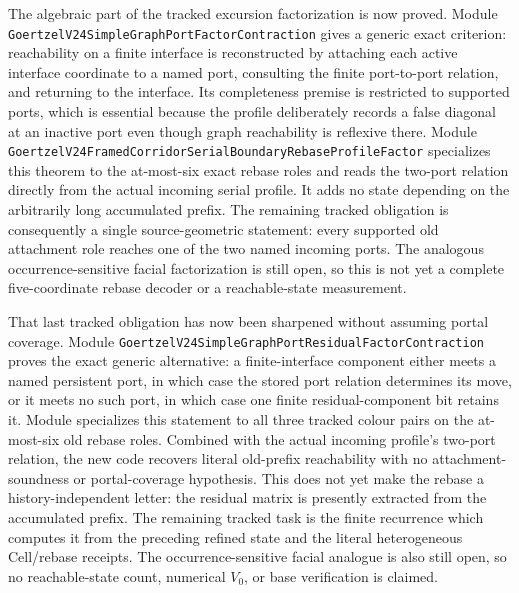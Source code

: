 \documentclass[11pt]{article}
\theoremstyle{definition}
\begin{document}
The algebraic part of the tracked excursion factorization is now proved.
Module
\texttt{GoertzelV24SimpleGraphPortFactorContraction} gives a generic exact
criterion: reachability on a finite interface is reconstructed by attaching
each active interface coordinate to a named port, consulting the finite
port-to-port relation, and returning to the interface.  Its completeness
premise is restricted to supported ports, which is essential because the
profile deliberately records a false diagonal at an inactive port even though
graph reachability is reflexive there.  Module
\texttt{GoertzelV24FramedCorridorSerialBoundaryRebaseProfileFactor}
specializes this theorem to the at-most-six exact rebase roles and reads the
two-port relation directly from the actual incoming serial profile.  It adds
no state depending on the arbitrarily long accumulated prefix.  The remaining
tracked obligation is consequently a single source-geometric statement:
every supported old attachment role reaches one of the two named incoming
ports.  The analogous occurrence-sensitive facial factorization is still
open, so this is not yet a complete five-coordinate rebase decoder or a
reachable-state measurement.

That last tracked obligation has now been sharpened without assuming portal
coverage.  Module
\texttt{GoertzelV24SimpleGraphPortResidualFactorContraction} proves the exact
generic alternative: a finite-interface component either meets a named
persistent port, in which case the stored port relation determines its move,
or it meets no such port, in which case one finite residual-component bit
retains it.  Module
specializes this statement to all three tracked colour pairs on the at-most-six
old rebase roles.  Combined with the actual incoming profile's two-port
relation, the new code recovers literal old-prefix reachability with no
attachment-soundness or portal-coverage hypothesis.  This does not yet make
the rebase a history-independent letter: the residual matrix is presently
extracted from the accumulated prefix.  The remaining tracked task is the
finite recurrence which computes it from the preceding refined state and the
literal heterogeneous Cell/rebase receipts.  The occurrence-sensitive facial
analogue is also still open, so no reachable-state count, numerical $V_0$, or
base verification is claimed.
\end{document}
